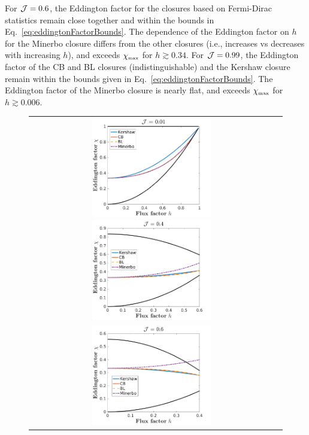 For $\mathcal{J}=0.6$, the Eddington factor for the closures based on Fermi-Dirac statistics remain close together and within the bounds in Eq.~\eqref{eq:eddingtonFactorBounds}.  
The dependence of the Eddington factor on $h$ for the Minerbo closure differs from the other closures (i.e., increases vs decreases with increasing $h$), and exceeds $\chi_{\mbox{\tiny max}}$ for $h\gtrsim0.34$.  
For $\mathcal{J}=0.99$, the Eddington factor of the CB and BL closures (indistinguishable) and the Kershaw closure remain within the bounds given in Eq.~\eqref{eq:eddingtonFactorBounds}.  
The Eddington factor of the Minerbo closure is nearly flat, and exceeds $\chi_{\mbox{\tiny max}}$ for $h\gtrsim0.006$.  

\begin{figure}[h]
  \centering
  \begin{tabular}{cc}
    \includegraphics[width=0.5\textwidth]{figures/Closures0_01}
    \includegraphics[width=0.5\textwidth]{figures/Closures0_40} \\
    \includegraphics[width=0.5\textwidth]{figures/Closures0_60}

\end{tabular}
\end{figure}
